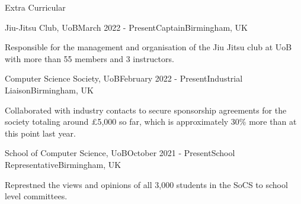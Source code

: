 \documentclass{resume} %
\begin{document}
\begin{rSection}{Extra Curricular}
\begin{rSubsection}{Jiu-Jitsu Club, UoB}{March 2022 - Present}{Captain}{Birmingham, UK}
\item Responsible for the management and organisation of the Jiu Jitsu club at UoB with more than 55 members and 3 instructors.
\end{rSubsection}

\begin{rSubsection}{Computer Science Society, UoB}{February 2022 - Present}{Industrial Liaison}{Birmingham, UK}
\item Collaborated with industry contacts to secure sponsorship agreements for the society totaling around £5,000 so far, which is approximately 30\% more than at this point last year. 
\end{rSubsection}

\begin{rSubsection}{School of Computer Science, UoB}{October 2021 - Present}{School Representative}{Birmingham, UK}
\item Represtned the views and opinions of all 3,000 students in the SoCS to school level committees.
\end{rSubsection}

\end{rSection}










\end{document}
